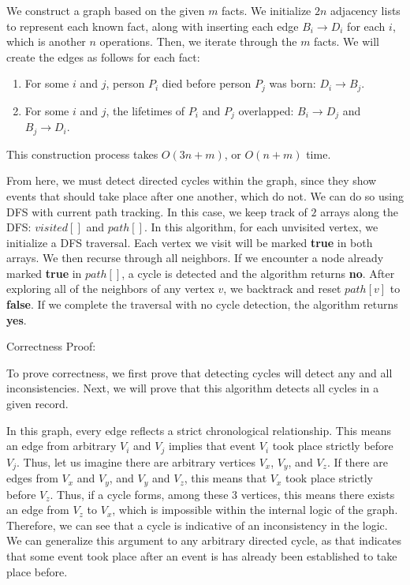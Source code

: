 \documentclass[11pt]{article}
\begin{document}
We construct a graph based on the given $m$ facts. We initialize $2n$ adjacency lists to represent each known fact, 
along with inserting each edge $B_i \rightarrow D_i$ for each $i$, which is another $n$ operations. 
Then, we iterate through the $m$ facts. We will create the edges as follows for each fact:

\begin{enumerate}[label=(\arabic*), noitemsep]
\item For some $i$ and $j$, person $P_i$ died before person $P_j$ was born: $D_i \rightarrow B_j$.
\item For some $i$ and $j$, the lifetimes of $P_i$ and $P_j$ overlapped: $B_i \rightarrow D_j$ and $B_j \rightarrow D_i$.
\end{enumerate}

This construction process takes $O(3n + m)$, or $O(n + m)$ time. 

From here, we must detect directed cycles within the graph, since they show events that should take place after one another, which do not. 
We can do so using DFS with current path tracking. In this case, we keep track of $2$ arrays along the DFS: 
$visited[]$ and $path[]$. In this algorithm, for each unvisited vertex, we initialize a DFS traversal. 
Each vertex we visit will be marked \textbf{true} in both arrays. We then recurse through all neighbors. 
If we encounter a node already marked \textbf{true} in $path[]$, a cycle is detected and the algorithm returns \textbf{no}. 
After exploring all of the neighbors of any vertex $v$, we backtrack and reset $path[v]$ to \textbf{false}. 
If we complete the traversal with no cycle detection, the algorithm returns \textbf{yes}.

\bigbreak

Correctness Proof:

To prove correctness, we first prove that detecting cycles will detect any and all inconsistencies. Next, we will prove that this algorithm detects 
all cycles in a given record. 

In this graph, every edge reflects a strict chronological relationship. This means an edge from arbitrary $V_i$ and $V_j$ implies that event $V_i$ 
took place strictly before $V_j$. Thus, let us imagine there are arbitrary vertices $V_x$, $V_y$, and $V_z$. If there are edges from $V_x$ and $V_y$, 
and $V_y$ and $V_z$, this means that $V_x$ took place strictly before $V_z$. Thus, if a cycle forms, among these $3$ vertices, 
this means there exists an edge from $V_z$ to $V_x$, which is impossible within the internal logic of the graph. Therefore, we can see that 
a cycle is indicative of an inconsistency in the logic. We can generalize this argument to any arbitrary directed cycle, as that indicates that 
some event took place after an event is has already been established to take place before. 
\end{document}
